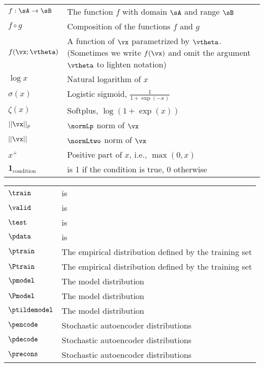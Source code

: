\clearpage
{}
\bgroup
\def\arraystretch{1.5}
\begin{tabular}{p{1.5in}p{3.5in}}
$\displaystyle f: \sA \rightarrow \sB$ & The function $f$ with domain $\sA$ and range $\sB$ \\
$\displaystyle f \circ g $ & Composition of the functions $f$ and $g$ \\
$\displaystyle f(\vx ; \vtheta) $ & A function of $\vx$ parametrized by $\vtheta$.
(Sometimes we write $f(\vx)$ and omit the argument $\vtheta$ to lighten notation) \\
$\displaystyle \log x$ & Natural logarithm of $x$ \\
$\displaystyle \sigma(x)$ & Logistic sigmoid, $\displaystyle \frac{1} {1 + \exp(-x)}$ \\
$\displaystyle \zeta(x)$ & Softplus, $\log(1 + \exp(x))$ \\
$\displaystyle || \vx ||_p $ & $\normLp$ norm of $\vx$ \\
$\displaystyle || \vx || $ & $\normLtwo$ norm of $\vx$ \\
$\displaystyle x^+$ & Positive part of $x$, i.e., $\max(0,x)$ \\
$\displaystyle \bm{1}_\mathrm{condition}$ & is 1 if the condition is true, 0 otherwise \\
\end{tabular}
\egroup
\vspace{0.5cm}

\clearpage
{}
\bgroup
\def\arraystretch{1.5}
\begin{tabular}{p{1.5in}p{3.5in}}
$\train$ & is \\
$\valid$ & is \\
$\test$ & is \\
$\pdata$ & is \\
$\ptrain$ & The empirical distribution defined by the training set \\
$\Ptrain$ & The empirical distribution defined by the training set \\
$\pmodel$ & The model distribution \\
$\Pmodel$ & The model distribution \\
$\ptildemodel$ & The model distribution \\
$\pencode$ & Stochastic autoencoder distributions \\
$\pdecode$ & Stochastic autoencoder distributions \\
$\precons$ & Stochastic autoencoder distributions \\
\end{tabular}
\egroup
\vspace{0.5cm}
